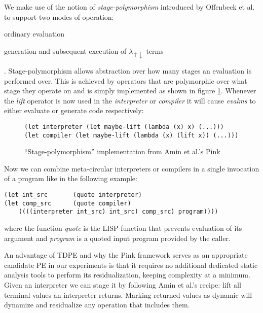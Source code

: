 \documentclass[a4paper,12pt,twoside,openright]{report}
\theoremstyle{definition}
\newcommand{\mslang}{$\lambda_{\uparrow\downarrow}$}
\begin{document}
We make use of the notion of \textit{stage-polymorphism} introduced by Offenbeck et al. \cite{ofenbeck2017staging} to support two modes of operation:
\begin{enumerate*}[label=(\arabic*)]
	\item ordinary evaluation
	\item generation and subsequent execution of \mslang{} terms
\end{enumerate*}.
Stage-polymorphism allows abstraction over how many stages an evaluation is performed over. This is achieved by operators that are polymorphic over what stage they operate on and is simply implemented as shown in figure \ref{lst:stage_poly_impl}. Whenever the \textit{lift} operator is now used in the \textit{interpreter} or \textit{compiler} it will cause \textit{evalms} to either evaluate or generate code respectively:

\begin{figure}[ht]
\centering
\begin{verbatim}
(let interpreter (let maybe-lift (lambda (x) x) (...)))
(let compiler (let maybe-lift (lambda (x) (lift x)) (...)))
\end{verbatim}
\caption{``Stage-polymorphism'' implementation from Amin et al.'s Pink \cite{amin2017collapsing}}
\label{lst:stage_poly_impl}
\end{figure}

Now we can combine meta-circular interpreters or compilers in a single invocation of a program like in the following example:
\begin{verbatim}
(let int_src       (quote interpreter)
(let comp_src      (quote compiler)
    ((((interpreter int_src) int_src) comp_src) program))))
\end{verbatim}
where the function \textit{quote} is the LISP function that prevents evaluation of its argument and \textit{program} is a quoted input program provided by the caller.

An advantage of TDPE and why the Pink framework serves as an appropriate candidate PE in our experiments is that it requires no additional dedicated static analysis tools to perform its residualization, keeping complexity at a minimum. Given an interpreter we can stage it by following Amin et al.'s \cite{amin2017collapsing} recipe: lift all terminal values an interpreter returns. Marking returned values as dynamic will dynamize and residualize any operation that includes them.
\end{document}
